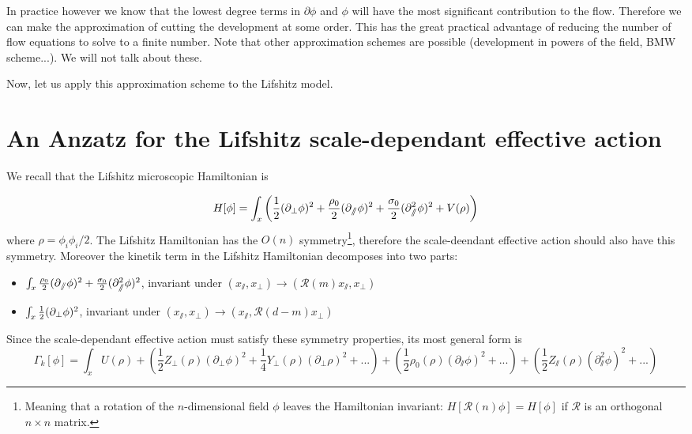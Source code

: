 In practice however we know that the lowest degree terms in $\partial \phi$ and $\phi$ will have the most significant contribution to the flow. Therefore we can make the approximation of cutting the development at some order. This has the great practical advantage of reducing the number of flow equations to solve to a finite number. Note that other approximation schemes are possible (development in powers of the field, BMW scheme...). We will not talk about these.

Now, let us apply this approximation scheme to the Lifshitz model.

\section{An Anzatz for the Lifshitz scale-dependant effective action}
We recall that the Lifshitz microscopic Hamiltonian is

\begin{equation}
H[\phi] = \int_x \left( \frac{1}{2}(\partial_{\perp} \phi)^2 + \frac{\rho_0}{2}(\partial_{\sslash} \phi)^2 + \frac{\sigma_0}{2} (\partial_{\sslash}^2 \phi)^2 + V(\rho) \right)
\end{equation}
where $\rho = \phi_i \phi_i/2$. 
The Lifshitz Hamiltonian has the $O(n)$ symmetry\footnote{Meaning that a rotation of the $n$-dimensional field $\phi$ leaves the Hamiltonian invariant: $H[\mathcal{R}(n)\phi] = H[\phi]$ if $\mathcal{R}$ is an orthogonal $n \times n$ matrix.}, therefore the scale-deendant effective action should also have this symmetry. Moreover the kinetik term in the Lifshitz Hamiltonian decomposes into two parts:
\begin{itemize}
\item $\int_{x} \frac{\rho_0}{2}(\partial_{\sslash} \phi)^2 + \frac{\sigma_0}{2} (\partial_{\sslash}^2 \phi)^2$, invariant under $\left(x_\sslash,x_\perp \right) \rightarrow \left(\mathcal{R}(m) x_\sslash, x_\perp\right)$
\item $\int_{x} \frac{1}{2}(\partial_{\perp} \phi)^2$, invariant under $\left(x_\sslash,x_\perp \right) \rightarrow \left(x_\sslash, \mathcal{R}(d-m) x_\perp\right)$
\end{itemize}
Since the scale-dependant effective action must satisfy these symmetry properties, its most general form is
\begin{equation}
\Gamma_k[\phi] = \int_{x} U(\rho) + \left( \frac{1}{2} Z_\perp(\rho) (\partial_\perp \phi)^2 + \frac{1}{4} Y_\perp(\rho) (\partial_\perp \rho)^2 + ... \right) + \left( \frac{1}{2} \rho_0(\rho) (\partial_\sslash \phi)^2 + ... \right) + \left( \frac{1}{2} Z_\sslash(\rho) (\partial_\sslash^2 \phi)^2 + ... \right)
\end{equation}

